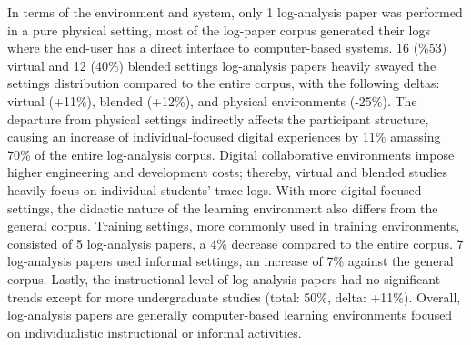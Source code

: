 \documentclass[manuscript,screen,review]{acmart}
\begin{document}
In terms of the environment and system, only 1 log-analysis paper was performed in a pure physical setting, most of the log-paper corpus generated their logs where the end-user has a direct interface to computer-based systems. 16 (\%53) virtual and 12 (40\%) blended settings log-analysis papers heavily swayed the settings distribution compared to the entire corpus, with the following deltas: virtual (+11\%), blended (+12\%), and physical environments (-25\%). The departure from physical settings indirectly affects the participant structure, causing an increase of individual-focused digital experiences by 11\% amassing 70\% of the entire log-analysis corpus. Digital collaborative environments impose higher engineering and development costs; thereby, virtual and blended studies heavily focus on individual students' trace logs. With more digital-focused settings, the didactic nature of the learning environment also differs from the general corpus. Training settings, more commonly used in training environments, consisted of 5 log-analysis papers, a 4\% decrease compared to the entire corpus. 7 log-analysis papers used informal settings, an increase of 7\% against the general corpus. Lastly, the instructional level of log-analysis papers had no significant trends except for more undergraduate studies (total: 50\%, delta: +11\%). Overall, log-analysis papers are generally computer-based learning environments focused on individualistic instructional or informal activities.
\end{document}
